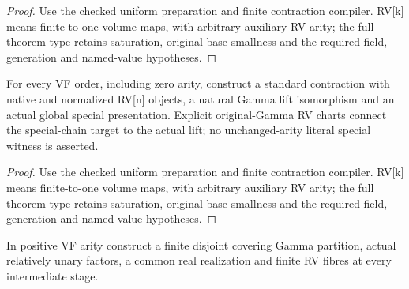 \begin{proof}


\leanok

Use the checked uniform preparation and finite contraction compiler. RV[k] means finite-to-one volume maps, with arbitrary auxiliary RV arity; the full theorem type retains saturation, original-base smallness and the required field, generation and named-value hypotheses.

\end{proof}

\begin{lemma}

\label{s5-5}


\leanok

For every VF order, including zero arity, construct a standard contraction with native and normalized RV[n] objects, a natural Gamma lift isomorphism and an actual global special presentation. Explicit original-Gamma RV charts connect the special-chain target to the actual lift; no unchanged-arity literal special witness is asserted.

\end{lemma}

\begin{proof}


\leanok

Use the checked uniform preparation and finite contraction compiler. RV[k] means finite-to-one volume maps, with arbitrary auxiliary RV arity; the full theorem type retains saturation, original-base smallness and the required field, generation and named-value hypotheses.

\end{proof}

\begin{lemma}

\label{s5-6}


\leanok

In positive VF arity construct a finite disjoint covering Gamma partition, actual relatively unary factors, a common real realization and finite RV fibres at every intermediate stage.

\end{lemma}

